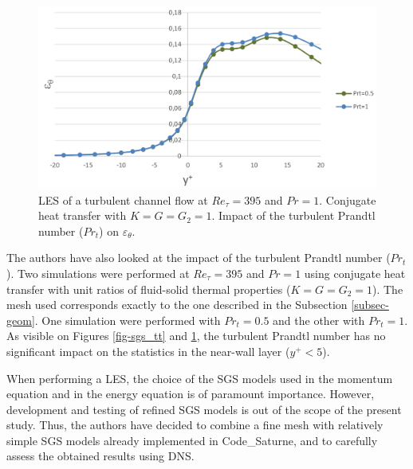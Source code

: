 \documentclass{svjour3}                     %
\begin{document}
\begin{figure}
\centering
\includegraphics[width=\textwidth]{./images/impact_Prt_dissTT.png}
\caption{
LES of a turbulent channel flow at $Re_\tau=395$ and $Pr=1$.
Conjugate heat transfer with $K = G = G_2 = 1$.
Impact of the turbulent Prandtl number ($Pr_t$) on $\varepsilon_\theta$.
}\label{fig-sgs_disstt}
\end{figure}

The authors have also looked at the impact of the turbulent Prandtl number ($Pr_t$).
Two simulations were performed at $Re_\tau = 395$ and $Pr = 1$ using conjugate heat transfer with unit ratios of fluid-solid thermal properties ($K = G = G_2 = 1$).
The mesh used corresponds exactly to the one described in the Subsection \ref{subsec-geom}.
One simulation were performed with $Pr_t = 0.5$ and the other with $Pr_t = 1$.
As visible on Figures \ref{fig-sgs_tt} and \ref{fig-sgs_disstt}, the turbulent Prandtl number has no significant impact on the statistics in the near-wall layer ($y^+ < 5$).

When performing a LES, the choice of the SGS models used in the momentum equation and in the energy equation is of paramount importance.
However, development and testing of refined SGS models is out of the scope of the present study.
Thus, the authors have decided to combine a fine mesh with relatively simple SGS models already implemented in Code\_Saturne, and to carefully assess the obtained results using DNS.
\end{document}
